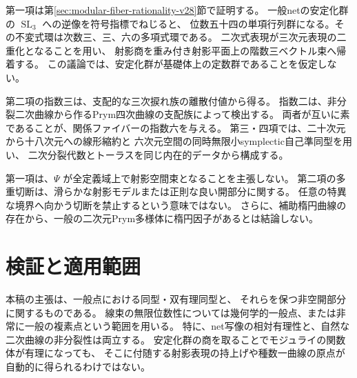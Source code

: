 第一項は第\ref{sec:modular-fiber-rationality-v28}節で証明する。
一般netの安定化群の $\operatorname{SL}_3$ への逆像を符号指標でねじると、
位数五十四の単項行列群になる。その不変式環は次数三、三、六の多項式環である。
二次式表現が三次元表現の二重化となることを用い、
射影商を重み付き射影平面上の階数三ベクトル束へ帰着する。
この議論では、安定化群が基礎体上の定数群であることを仮定しない。

第二項の指数三は、支配的な三次捩れ族の離散付値から得る。
指数二は、非分裂二次曲線から作るPrym四次曲線の支配族によって検出する。
両者が互いに素であることが、関係ファイバーの指数六を与える。
第三・四項では、二十次元から十八次元への線形縮約と
六次元空間の同時無限小symplectic自己準同型を用い、
二次分裂代数とトーラスを同じ内在的データから構成する。

第一項は、$\Psi$ が全定義域上で射影空間束となることを主張しない。
第二項の多重切断は、滑らかな射影モデルまたは正則な良い開部分に関する。
任意の特異な境界へ向かう切断を禁止するという意味ではない。
さらに、補助楕円曲線の存在から、一般の二次元Prym多様体に楕円因子があるとは結論しない。










\section{検証と適用範囲}

本稿の主張は、一般点における同型・双有理同型と、
それらを保つ非空開部分に関するものである。
線束の無限位数性については幾何学的一般点、または非常に一般の複素点という範囲を用いる。
特に、net写像の相対有理性と、自然な二次曲線の非分裂性は両立する。
安定化群の商を取ることでモジュライの関数体が有理になっても、
そこに付随する射影表現の持上げや種数一曲線の原点が自動的に得られるわけではない。

